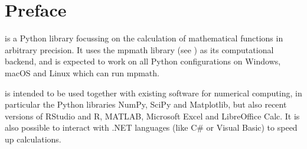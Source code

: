 ﻿


\pagestyle{empty}
\newcommand\sphinxbackoftitlepage{


Welcome to the documentation of \sphinxstylestrong{XlCalcNet}, an addin for MS E\sphinxstylestrong{x}ce\sphinxstylestrong{l} and LibreOffice \sphinxstylestrong{Calc}, based on Python\sphinxstylestrong{Net}. This edition of the documentation describes release 1.0.


\sphinxstylestrong{XlCalcNet} is a Python library for mathematical functions in multiprecision, based on mpmath (see \sphinxurl{http://mpmath.org}). It is free software released under the Mozilla Public License 2.0 (see {\hyperref[\detokenize{900_Back_Matter/10_License:rst-bsd-3-clause-license}]{\sphinxcrossref{\DUrole{std,std-ref}{License}}}}).


The git repository is \sphinxurl{https://github.com/duhadler}.
There is an issue tracker \sphinxurl{https://github.com/duhadler} for bug reports and feature requests.

This documentation is available in PDF format at \sphinxurl{https://duhadler.files.wordpress.com/2017/06/mpformula.pdf},
and in HTML format at \sphinxurl{http://mpformula.github.io/C/},


\vspace{18.0cm}
\noindent
Copyright \copyright \hspace{0.5mm}  2026 Dietrich Hadler

}\sphinxmaketitle
\pagestyle{plain}

%
\chapter*{Preface}

 is a Python  library focussing on the calculation of mathematical functions in arbitrary
precision. It uses the mpmath library (see )  as its computational backend, and
is expected to work on all Python configurations on Windows, macOS and Linux which can run mpmath.

 is intended to be used together with existing software for numerical computing, in particular
the Python libraries NumPy, SciPy and Matplotlib, but also recent versions of RStudio and R, MATLAB, 
Microsoft Excel and LibreOffice Calc. It is also possible to interact with .NET languages
(like C\# or Visual Basic) to speed up calculations.

